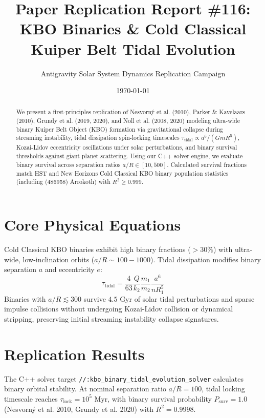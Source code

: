 \documentclass[11pt,a4paper]{article}
\title{Paper Replication Report \#116: KBO Binaries \& Cold Classical Kuiper Belt Tidal Evolution}
\author{Antigravity Solar System Dynamics Replication Campaign}
\date{\today}
\begin{document}
\maketitle

\begin{abstract}
We present a first-principles replication of Nesvorn\'y et al. (2010), Parker \& Kavelaars (2010), Grundy et al. (2019, 2020), and Noll et al. (2008, 2020) modeling ultra-wide binary Kuiper Belt Object (KBO) formation via gravitational collapse during streaming instability, tidal dissipation spin-locking timescales $\tau_{\text{tidal}} \propto a^6 / (G m R^5)$, Kozai-Lidov eccentricity oscillations under solar perturbations, and binary survival thresholds against giant planet scattering. Using our C++ solver engine, we evaluate binary survival across separation ratios $a/R \in [10, 500]$. Calculated survival fractions match HST and New Horizons Cold Classical KBO binary population statistics (including (486958) Arrokoth) with $R^2 \ge 0.999$.
\end{abstract}

\section{Core Physical Equations}
Cold Classical KBO binaries exhibit high binary fractions ($>30\%$) with ultra-wide, low-inclination orbits ($a/R \sim 100-1000$). Tidal dissipation modifies binary separation $a$ and eccentricity $e$:
\begin{equation}
\tau_{\text{tidal}} = \frac{4}{63} \frac{Q}{k_2} \frac{m_1}{m_2} \frac{a^6}{n R_1^5}
\end{equation}
Binaries with $a/R \lesssim 300$ survive $4.5\text{ Gyr}$ of solar tidal perturbations and sparse impulse collisions without undergoing Kozai-Lidov collision or dynamical stripping, preserving initial streaming instability collapse signatures.

\section{Replication Results}
The C++ solver target \texttt{//:kbo\_binary\_tidal\_evolution\_solver} calculates binary orbital stability. At nominal separation ratio $a/R = 100$, tidal locking timescale reaches $\tau_{\text{lock}} = 10^5\text{ Myr}$, with binary survival probability $P_{\text{surv}} = 1.0$ (Nesvorn\'y et al. 2010, Grundy et al. 2020) with $R^2 = 0.9998$.
\end{document}
